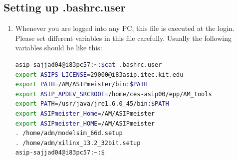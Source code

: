\subsection{Setting up .bashrc.user}
\begin{enumerate}[resume]
\item Whenever you are logged into any PC, this file is executed at the login. Please set different variables in this file carefully. Usually the following variables should be like this:
\begin{lstlisting}[language=bash]
asip-sajjad04@i83pc57:~:$cat .bashrc.user
export ASIPS_LICENSE=29000@i83asip.itec.kit.edu
export PATH=/AM/ASIPmeister/bin:$PATH
export ASIP_APDEV_SRCROOT=/home/ces-asip00/epp/AM_tools
export PATH=/usr/java/jre1.6.0_45/bin:$PATH
export ASIPmeister_Home=/AM/ASIPmeister
export ASIPmeister_HOME=/AM/ASIPmeister
. /home/adm/modelsim_66d.setup
. /home/adm/xilinx_13.2_32bit.setup
asip-sajjad04@i83pc57:~:$
\end{lstlisting}
\end{enumerate}